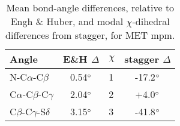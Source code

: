 \bigskip


\begin{table}[h]
\vspace{-10pt}
\begin{tabular}{lc|lc} \\ \toprule
Angle     & E\&H $\Delta$ & $\chi$ & stagger $\Delta$ \\ \bottomrule
N-C$\alpha$-C$\beta$  & 0.54$\degree$ & 1 & -17.2$\degree$\\
C$\alpha$-C$\beta$-C$\gamma$  & 2.04$\degree$ & 2 & +4.0$\degree$\\
C$\beta$-C$\gamma$-S$\delta$ & 3.15$\degree$ & 3 & -41.8$\degree$\\ \bottomrule
\end{tabular}
\caption{Mean bond-angle differences, relative to Engh \& Huber, and modal $\chi$-dihedral differences from stagger, for MET mpm.}
\label{tab:metmpmangles}
\vspace{-10pt}
\end{table}